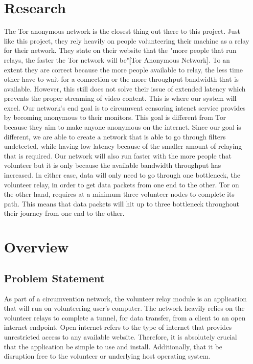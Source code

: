 \documentclass[12pt,a4paper]{report}
\begin{document}
\chapter{Research}
The Tor anonymous network is the closest thing out there to this project. Just like this project, they rely heavily on people volunteering their machine as a relay for their network. They state on their website that the "more people that run relays, the faster the Tor network will be"[Tor Anonymous Network]. To an extent they are correct because the more people available to relay, the less time other have to wait for a connection or the more throughput bandwidth that is available. However, this still does not solve their issue of extended latency which prevents the proper streaming of video content. This is where our system will excel. Our network's end goal is to circumvent censoring intenet service provides by becoming anonymous to their monitors. This goal is different from Tor because they aim to make anyone anonymous on the internet. Since our goal is different, we are able to create a network that is able to go through filters undetected, while having low latency because of the smaller amount of relaying that is required. Our network will also run faster with the more people that volunteer but it is only because the available bandwidth throughput has increased. In either case, data will only need to go through one bottleneck, the volunteer relay, in order to get data packets from one end to the other. Tor on the other hand, requires at a minimum three volunteer nodes to complete its path. This means that data packets will hit up to three bottleneck throughout their journey from one end to the other.   

\chapter{Overview}
	
	\section{Problem Statement}
	As part of a circumvention network, the volunteer relay module is an application that will run on volunteering user's computer. The network heavily relies on the volunteer relays to complete a tunnel, for data transfer, from a client to an open internet endpoint. Open internet refers to the type of internet that provides unrestricted access to any available website. Therefore, it is absolutely crucial that the application be simple to use and install. Additionally, that it be disruption free to the volunteer or underlying host operating system. 
	 
\end{document}

